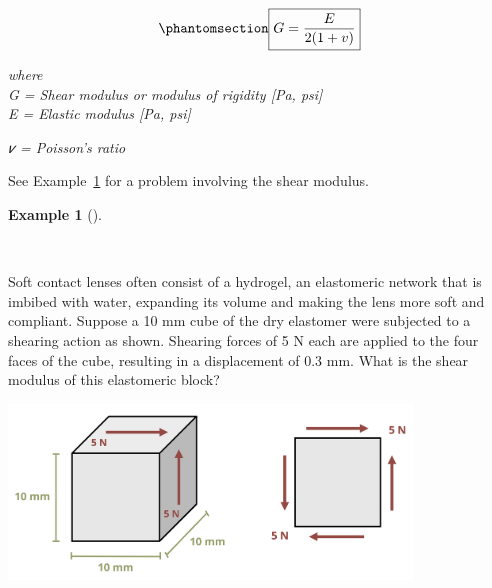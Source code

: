 \documentclass[
  letterpaper,
  DIV=11,
  numbers=noendperiod]{scrreprt}
\theoremstyle{definition}
\newtheorem{example}{Example}[chapter]
\theoremstyle{remark}
\begin{document}
\begin{equation}\phantomsection\label{eq-4.4}{
\boxed{G=\frac{E}{2(1+v)}}
}\end{equation}

\emph{where}\\
\emph{G = Shear modulus or modulus of rigidity {[}Pa, psi{]}}\\
\emph{E = Elastic modulus {[}Pa, psi{]}}

\emph{𝜈 = Poisson's ratio}

See Example~\ref{exm-4.3} for a problem involving the shear modulus.

\begin{tcolorbox}[enhanced jigsaw, colback=white, colframe=quarto-callout-tip-color-frame, toptitle=1mm, arc=.35mm, bottomrule=.15mm, toprule=.15mm, opacitybacktitle=0.6, title={Example 4.3}, coltitle=black, breakable, colbacktitle=quarto-callout-tip-color!10!white, bottomtitle=1mm, titlerule=0mm, opacityback=0, leftrule=.75mm, left=2mm, rightrule=.15mm]

\begin{example}[]\protect\hypertarget{exm-4.3}{}\label{exm-4.3}

~

Soft contact lenses often consist of a hydrogel, an elastomeric network
that is imbibed with water, expanding its volume and making the lens
more soft and compliant. Suppose a 10 mm cube of the dry elastomer were
subjected to a shearing action as shown. Shearing forces of 5 N each are
applied to the four faces of the cube, resulting in a displacement of
0.3 mm. What is the shear modulus of this elastomeric block?

\begin{center}
\includegraphics[width=4.22917in,height=\textheight]{images/Chapter 4 edits v2/example 4.3 v2.png}
\end{center}

\begin{tcolorbox}[enhanced jigsaw, colback=white, colframe=quarto-callout-tip-color-frame, toptitle=1mm, arc=.35mm, bottomrule=.15mm, toprule=.15mm, opacitybacktitle=0.6, title={Solution}, coltitle=black, breakable, colbacktitle=quarto-callout-tip-color!10!white, bottomtitle=1mm, titlerule=0mm, opacityback=0, leftrule=.75mm, left=2mm, rightrule=.15mm]


\end{tcolorbox}
\end{example}
\end{tcolorbox}
\end{document}
